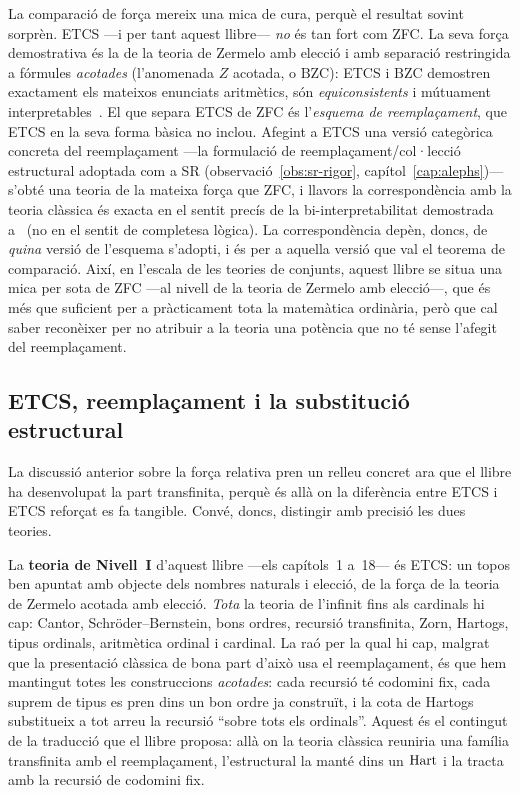 \begin{observacio}\label{obs:forca-relativa}
La comparació de força mereix una mica de cura, perquè el resultat sovint
sorprèn. ETCS ---i per tant aquest llibre--- \emph{no} és tan fort com
ZFC. La seva força demostrativa és la de la teoria de Zermelo amb elecció
i amb separació restringida a fórmules \emph{acotades} (l'anomenada
\(Z\) acotada, o \(\mathrm{BZC}\)): ETCS i \(\mathrm{BZC}\) demostren
exactament els mateixos enunciats aritmètics, són \emph{equiconsistents} i
mútuament interpretables~\cite{osius1974,mclarty-catset}. El que separa ETCS de ZFC
és l'\emph{esquema de reemplaçament}, que ETCS en la seva forma bàsica no
inclou. Afegint a ETCS una versió categòrica concreta del reemplaçament ---la
formulació de reemplaçament\slash col·lecció estructural adoptada com a SR
(observació~\ref{obs:sr-rigor}, capítol~\ref{cap:alephs})--- s'obté una teoria
de la mateixa força que ZFC, i llavors la correspondència amb la teoria
clàssica és exacta en el sentit precís de la bi-interpretabilitat demostrada
a~\cite{osius1974,shulman-comparing} (no en el sentit de completesa lògica).
La correspondència depèn, doncs, de \emph{quina} versió de l'esquema
s'adopti, i és per a aquella versió que val el teorema de comparació. Així, en
l'escala de les teories de conjunts, aquest llibre se situa una mica per
sota de ZFC ---al nivell de la teoria de Zermelo amb elecció---, que és
més que suficient per a pràcticament tota la matemàtica ordinària, però
que cal saber reconèixer per no atribuir a la teoria una potència que no
té sense l'afegit del reemplaçament.
\end{observacio}

\subsection{ETCS, reemplaçament i la substitució estructural}\label{sec:etcs-sr}

La discussió anterior sobre la força relativa pren un relleu concret ara que
el llibre ha desenvolupat la part transfinita, perquè és allà on la
diferència entre ETCS i ETCS reforçat es fa tangible. Convé, doncs,
distingir amb precisió les dues teories.

La \textbf{teoria de Nivell~I} d'aquest llibre ---els capítols~1 a~18--- és
ETCS: un topos ben apuntat amb objecte dels nombres naturals i elecció, de
la força de la teoria de Zermelo acotada amb elecció. \emph{Tota} la teoria
de l'infinit fins als cardinals hi cap: Cantor, Schröder--Bernstein, bons
ordres, recursió transfinita, Zorn, Hartogs, tipus ordinals, aritmètica
ordinal i cardinal. La raó per la qual hi cap, malgrat que la presentació
clàssica de bona part d'això usa el reemplaçament, és que hem mantingut
totes les construccions \emph{acotades}: cada recursió té codomini fix, cada
suprem de tipus es pren dins un bon ordre ja construït, i la cota de Hartogs
substitueix a tot arreu la recursió \enquote{sobre tots els ordinals}. Aquest
és el contingut de la traducció que el llibre proposa: allà on la teoria
clàssica reuniria una família transfinita amb el reemplaçament, l'estructural
la manté dins un \(\operatorname{Hart}\) i la tracta amb la recursió de codomini fix.

